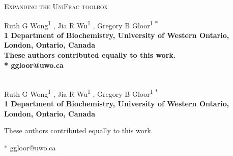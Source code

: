 \documentclass[10pt,letterpaper]{article}
\date{}
\begin{document}
\begin{titlepage}
	\centering
	\vspace{1cm}
	{\scshape\Large Expanding the UniFrac toolbox\par}
	\vspace{1.5cm}
  Ruth G Wong\textsuperscript{1 \Yinyang},
  Jia R Wu\textsuperscript{1 \Yinyang},
  Gregory B Gloor\textsuperscript{1 *}
  \\
	\vfill
  \bf{1} Department of Biochemistry, University of Western Ontario, London, Ontario, Canada\\
  \Yinyang These authors contributed equally to this work.\\
  * ggloor@uwo.ca
\end{titlepage}

\newpage

\vspace*{0.35in}

\begin{flushleft}
{\Large
\textbf{}
}
\newline
\\
Ruth G Wong\textsuperscript{1 \Yinyang},
Jia R Wu\textsuperscript{1 \Yinyang},
Gregory B Gloor\textsuperscript{1 *}
\\
\bigskip
\bf{1} Department of Biochemistry, University of Western Ontario, London, Ontario, Canada
\\
\bigskip

% 
%
\Yinyang These authors contributed equally to this work.





* ggloor@uwo.ca

\end{flushleft}
\end{document}
